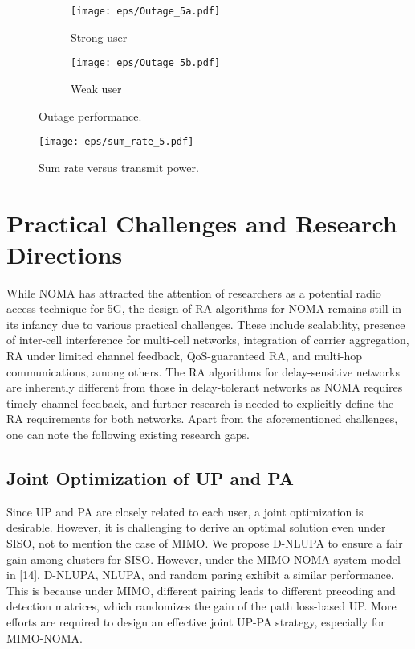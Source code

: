 \documentclass[10pt,final,journal,a4paper,twoside,twocolumn,romanappendices]{IEEEtran}
\theoremstyle{myremark}
\theoremstyle{myremark}
\begin{document}
\begin{figure*}
\centering
\begin{subfigure}{0.5\textwidth}
  \centering
  \texttt{[image: eps/Outage\_5a.pdf]}
  \caption{Strong user}
  \label{fig:sub1}
\end{subfigure}%
\begin{subfigure}{0.5\textwidth}
  \centering
  \texttt{[image: eps/Outage\_5b.pdf]}
  \caption{Weak user}
  \label{fig:sub2}
\end{subfigure}
\caption{{\color{black}Outage performance. }}
\label{fig:test}
\end{figure*}



\begin{figure}
\centering
\texttt{[image: eps/sum\_rate\_5.pdf]}
\caption{Sum rate versus transmit power.}
\end{figure}  

\section{Practical Challenges and Research Directions}
While NOMA has attracted the attention of researchers as a potential radio access technique for 5G, the design of RA algorithms for NOMA remains still in its infancy due to various practical challenges. These include scalability, presence of inter-cell interference for multi-cell networks, integration of carrier aggregation, RA under limited channel feedback, QoS-guaranteed RA, and multi-hop communications, among others. The RA algorithms for delay-sensitive networks are inherently different from those in delay-tolerant networks as NOMA requires timely channel feedback, and further research is needed to explicitly define the RA requirements for both networks. Apart from the aforementioned challenges, one can note the following existing research gaps.

\subsection{Joint Optimization of UP and PA}
Since UP and PA are closely related to each user, a joint optimization is desirable. However, it is challenging to derive an optimal solution even under SISO, not to mention the case of MIMO. We propose D-NLUPA to ensure a fair gain among clusters for SISO. However, under the MIMO-NOMA system model in [14], D-NLUPA, NLUPA, and random paring exhibit a similar performance.  This is because under MIMO, different pairing leads to different precoding and detection matrices, which randomizes the gain of the path loss-based UP. More efforts are required to design an effective joint UP-PA strategy, especially for MIMO-NOMA.
\end{document}
